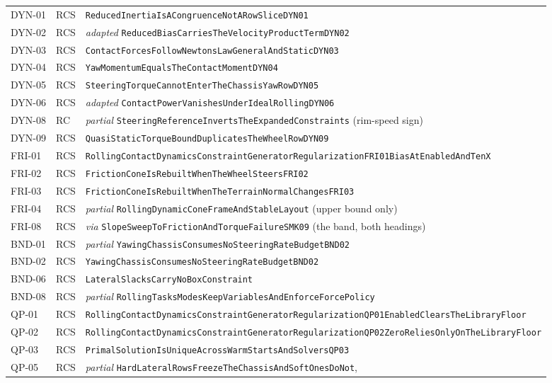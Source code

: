 \documentclass[10pt]{article}
\begin{document}
{\begin{longtable}{|l|l|p{}|}
  DYN-01 & RCS & \texttt{ReducedInertiaIsACongruenceNotARowSliceDYN01} \\
  DYN-02 & RCS & \emph{adapted} \texttt{ReducedBiasCarriesTheVelocityProductTermDYN02} \\
  DYN-03 & RCS & \texttt{ContactForcesFollowNewtonsLawGeneralAndStaticDYN03} \\
  DYN-04 & RCS & \texttt{YawMomentumEqualsTheContactMomentDYN04} \\
  DYN-05 & RCS & \texttt{SteeringTorqueCannotEnterTheChassisYawRowDYN05} \\
  DYN-06 & RCS & \emph{adapted} \texttt{ContactPowerVanishesUnderIdealRollingDYN06} \\
  DYN-08 & RC & \emph{partial} \texttt{SteeringReferenceInvertsTheExpandedConstraints} (rim-speed sign) \\
  DYN-09 & RCS & \texttt{QuasiStaticTorqueBoundDuplicatesTheWheelRowDYN09} \\
  FRI-01 & RCS & \texttt{RollingContactDynamicsConstraintGeneratorRegularizationFRI01BiasAtEnabledAndTenX} \\
  FRI-02 & RCS & \texttt{FrictionConeIsRebuiltWhenTheWheelSteersFRI02} \\
  FRI-03 & RCS & \texttt{FrictionConeIsRebuiltWhenTheTerrainNormalChangesFRI03} \\
  FRI-04 & RCS & \emph{partial} \texttt{RollingDynamicConeFrameAndStableLayout} (upper bound only) \\
  FRI-08 & RCS & \emph{via} \texttt{SlopeSweepToFrictionAndTorqueFailureSMK09} (the band, both headings) \\
  BND-01 & RCS & \emph{partial} \texttt{YawingChassisConsumesNoSteeringRateBudgetBND02} \\
  BND-02 & RCS & \texttt{YawingChassisConsumesNoSteeringRateBudgetBND02} \\
  BND-06 & RCS & \texttt{LateralSlacksCarryNoBoxConstraint} \\
  BND-08 & RCS & \emph{partial} \texttt{RollingTasksModesKeepVariablesAndEnforceForcePolicy} \\
  QP-01 & RCS & \texttt{RollingContactDynamicsConstraintGeneratorRegularizationQP01EnabledClearsTheLibraryFloor} \\
  QP-02 & RCS & \texttt{RollingContactDynamicsConstraintGeneratorRegularizationQP02ZeroReliesOnlyOnTheLibraryFloor} \\
  QP-03 & RCS & \texttt{PrimalSolutionIsUniqueAcrossWarmStartsAndSolversQP03} \\
  QP-05 & RCS & \emph{partial} \texttt{HardLateralRowsFreezeTheChassisAndSoftOnesDoNot},

\end{longtable}}
\end{document}
